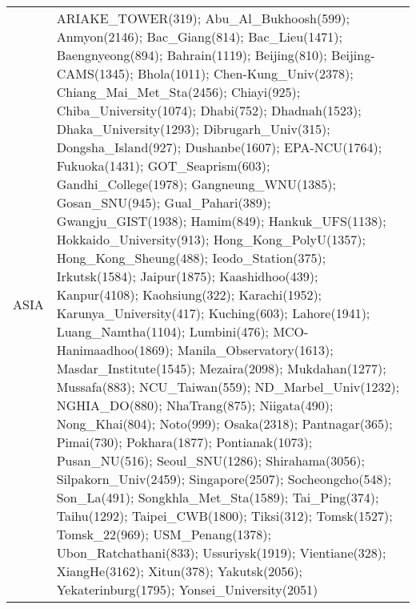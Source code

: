 \documentclass[journal abbreviation, manuscript]{copernicus}
\begin{document}
\begin{table}
\begin{tabularx}{\textwidth}{lX}
      ASIA &                                                                                                                                                                                                                                                                                                                                                                                                                                                                                                                                                                                                                                                                                                                                                                                                         ARIAKE\_TOWER(319); Abu\_Al\_Bukhoosh(599); Anmyon(2146); Bac\_Giang(814); Bac\_Lieu(1471); Baengnyeong(894); Bahrain(1119); Beijing(810); Beijing-CAMS(1345); Bhola(1011); Chen-Kung\_Univ(2378); Chiang\_Mai\_Met\_Sta(2456); Chiayi(925); Chiba\_University(1074); Dhabi(752); Dhadnah(1523); Dhaka\_University(1293); Dibrugarh\_Univ(315); Dongsha\_Island(927); Dushanbe(1607); EPA-NCU(1764); Fukuoka(1431); GOT\_Seaprism(603); Gandhi\_College(1978); Gangneung\_WNU(1385); Gosan\_SNU(945); Gual\_Pahari(389); Gwangju\_GIST(1938); Hamim(849); Hankuk\_UFS(1138); Hokkaido\_University(913); Hong\_Kong\_PolyU(1357); Hong\_Kong\_Sheung(488); Ieodo\_Station(375); Irkutsk(1584); Jaipur(1875); Kaashidhoo(439); Kanpur(4108); Kaohsiung(322); Karachi(1952); Karunya\_University(417); Kuching(603); Lahore(1941); Luang\_Namtha(1104); Lumbini(476); MCO-Hanimaadhoo(1869); Manila\_Observatory(1613); Masdar\_Institute(1545); Mezaira(2098); Mukdahan(1277); Mussafa(883); NCU\_Taiwan(559); ND\_Marbel\_Univ(1232); NGHIA\_DO(880); NhaTrang(875); Niigata(490); Nong\_Khai(804); Noto(999); Osaka(2318); Pantnagar(365); Pimai(730); Pokhara(1877); Pontianak(1073); Pusan\_NU(516); Seoul\_SNU(1286); Shirahama(3056); Silpakorn\_Univ(2459); Singapore(2507); Socheongcho(548); Son\_La(491); Songkhla\_Met\_Sta(1589); Tai\_Ping(374); Taihu(1292); Taipei\_CWB(1800); Tiksi(312); Tomsk(1527); Tomsk\_22(969); USM\_Penang(1378); Ubon\_Ratchathani(833); Ussuriysk(1919); Vientiane(328); XiangHe(3162); Xitun(378); Yakutsk(2056); Yekaterinburg(1795); Yonsei\_University(2051) \\

\end{tabularx}
\end{table}
\end{document}
